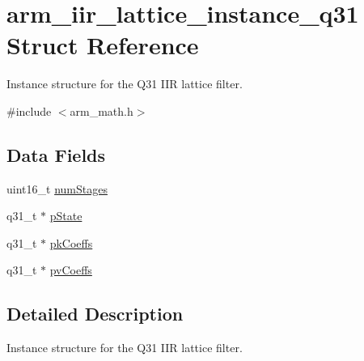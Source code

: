 \hypertarget{structarm__iir__lattice__instance__q31}{\section{arm\-\_\-iir\-\_\-lattice\-\_\-instance\-\_\-q31 Struct Reference}
\label{structarm__iir__lattice__instance__q31}
}


Instance structure for the Q31 I\-I\-R lattice filter.  




{\ttfamily \#include $<$arm\-\_\-math.\-h$>$}

\subsection*{Data Fields}
\begin{DoxyCompactItemize}
\item 
uint16\-\_\-t \hyperlink{structarm__iir__lattice__instance__q31_a4cceb90547b3e585d4c7aabaa8057212}{num\-Stages}
\item 
q31\-\_\-t $\ast$ \hyperlink{structarm__iir__lattice__instance__q31_adee4ba3ee8869865af7d8fa08ca913d6}{p\-State}
\item 
q31\-\_\-t $\ast$ \hyperlink{structarm__iir__lattice__instance__q31_a9d45339bf841bf86aec57be5f70d2b01}{pk\-Coeffs}
\item 
q31\-\_\-t $\ast$ \hyperlink{structarm__iir__lattice__instance__q31_a3d7de56fe9de3458f033a64f14407533}{pv\-Coeffs}
\end{DoxyCompactItemize}


\subsection{Detailed Description}
Instance structure for the Q31 I\-I\-R lattice filter. 

